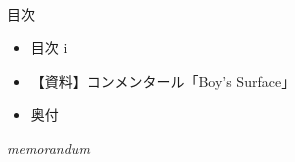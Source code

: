 \documentclass[10pt, a5paper, twoside]{jsarticle}
\theoremstyle{definition}
\begin{document}
	\begin{center}

	~ %

		\Large{目次}

		\vspace{5mm}

	\end{center}

	\begin{itemize}

		\item 目次 \dotfill i

			\vspace{3mm}

		\item 【資料】コンメンタール「Boy's Surface」 

			\vspace{3mm}

		\item 奥付 

	\end{itemize}

	\vfill


	\newpage

	\begin{center}

		\Large{\textit{memorandum}}

	\end{center}
\end{document}
